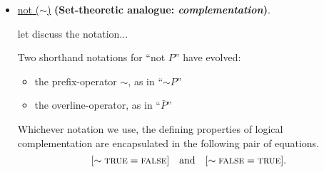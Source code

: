 \begin{itemize}
\item
\underline{{\sc not} ($\sim$)}
{\bf (Set-theoretic analogue: {\em complementation})}.

{\Denis let discuss the notation...}

Two shorthand notations for ``{\sc not} $P$'' have evolved:
  \begin{itemize}
  \item
the prefix-operator $\sim$, as in ``$\sim P$''
  \item
the overline-operator, as in ``$\bar{P}$''
  \end{itemize}
Whichever notation we use, the defining properties of logical
complementation are encapsulated in the following pair of equations.
\[
[\sim \mbox{\sc true} = \mbox{\sc false}] \ \ \mbox{ and } \ \ [\sim
  \mbox{\sc false} = \mbox{\sc true}].
\]
\end{itemize}

\medskip

